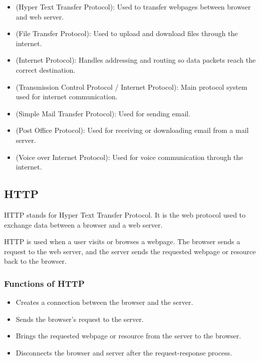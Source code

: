 \begin{itemize}
    \item {} (Hyper Text Transfer Protocol): Used to transfer webpages between browser and web server.
    \item {} (File Transfer Protocol): Used to upload and download files through the internet.
    \item {} (Internet Protocol): Handles addressing and routing so data packets reach the correct destination.
    \item {} (Transmission Control Protocol / Internet Protocol): Main protocol system used for internet communication.
    \item {} (Simple Mail Transfer Protocol): Used for sending email.
    \item {} (Post Office Protocol): Used for receiving or downloading email from a mail server.
    \item {} (Voice over Internet Protocol): Used for voice communication through the internet.
\end{itemize}

\subsection{HTTP}

\begin{definitionbox}[HTTP]
HTTP stands for Hyper Text Transfer Protocol. It is the web protocol used to exchange data between a browser and a web server.
\end{definitionbox}

\Note HTTP is used when a user visits or browses a webpage. The browser sends a request to the web server, and the server sends the requested webpage or resource back to the browser.

\subsubsection{Functions of HTTP}

\begin{itemize}
    \item Creates a connection between the browser and the server.
    \item Sends the browser's request to the server.
    \item Brings the requested webpage or resource from the server to the browser.
    \item Disconnects the browser and server after the request-response process.
\end{itemize}


